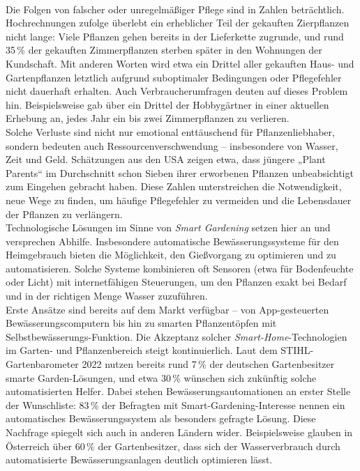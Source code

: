 \\
Die Folgen von falscher oder unregelmäßiger Pflege sind in Zahlen beträchtlich. Hochrechnungen zufolge überlebt ein erheblicher Teil der gekauften Zierpflanzen nicht lange: Viele Pflanzen gehen bereits in der Lieferkette zugrunde, und rund 35\,\% der gekauften Zimmerpflanzen sterben später in den Wohnungen der Kundschaft. \autocite{pflanzensterben_statistik} Mit anderen Worten wird etwa ein Drittel aller gekauften Haus- und Gartenpflanzen letztlich aufgrund suboptimaler Bedingungen oder Pflegefehler nicht dauerhaft erhalten. Auch Verbraucherumfragen deuten auf dieses Problem hin. Beispielsweise gab über ein Drittel der Hobbygärtner in einer aktuellen Erhebung an, jedes Jahr ein bis zwei Zimmerpflanzen zu verlieren. \autocite{pflanzensterben_statistik_2} 
\\
Solche Verluste sind nicht nur emotional enttäuschend für Pflanzenliebhaber, sondern bedeuten auch Ressourcenverschwendung – insbesondere von Wasser, Zeit und Geld. Schätzungen aus den USA zeigen etwa, dass jüngere „Plant Parents“ im Durchschnitt schon Sieben ihrer erworbenen Pflanzen unbeabsichtigt zum Eingehen gebracht haben.\autocite{pflanzensterben_statistik_3} Diese Zahlen unterstreichen die Notwendigkeit, neue Wege zu finden, um häufige Pflegefehler zu vermeiden und die Lebensdauer der Pflanzen zu verlängern.
\\
Technologische Lösungen im Sinne von \textit{Smart Gardening} setzen hier an und versprechen Abhilfe. Insbesondere automatische Bewässerungssysteme für den Heimgebrauch bieten die Möglichkeit, den Gießvorgang zu optimieren und zu automatisieren. Solche Systeme kombinieren oft Sensoren (etwa für Bodenfeuchte oder Licht) mit internetfähigen Steuerungen, um den Pflanzen exakt bei Bedarf und in der richtigen Menge Wasser zuzuführen. 
\\
Erste Ansätze sind bereits auf dem Markt verfügbar – von App-gesteuerten Bewässerungscomputern bis hin zu smarten Pflanzentöpfen mit Selbstbewässerungs-Funktion. Die Akzeptanz solcher \textit{Smart-Home}-Technologien im Garten- und Pflanzenbereich steigt kontinuierlich. Laut dem STIHL-Gartenbarometer 2022 nutzen bereits rund 7\,\% der deutschen Gartenbesitzer smarte Garden-Lösungen, und etwa 30\,\% wünschen sich zukünftig solche automatisierten Helfer. \autocite{smart_gardening} Dabei stehen Bewässerungsautomationen an erster Stelle der Wunschliste: 83\,\% der Befragten mit Smart-Gardening-Interesse nennen ein automatisches Bewässerungssystem als besonders gefragte Lösung. Diese Nachfrage spiegelt sich auch in anderen Ländern wider. Beispielsweise glauben in Österreich über 60\,\% der Gartenbesitzer, dass sich der Wasserverbrauch durch automatisierte Bewässerungsanlagen deutlich optimieren lässt. \autocite{gardena} 

